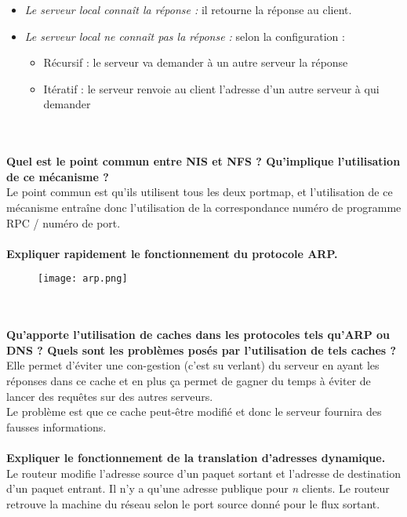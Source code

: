 \documentclass[journal, a4paper]{IEEEtran}
\begin{document}
\begin{itemize}
	\item \textit{Le serveur local connaît la réponse :} il retourne la réponse au client.
	\item \textit{Le serveur local ne connaît pas la réponse :} selon la configuration :
	\begin{itemize}
		\item Récursif : le serveur va demander à un autre serveur la réponse
		\item Itératif : le serveur renvoie au client l'adresse d'un autre serveur à qui demander
	\end{itemize}
\end{itemize}
~\\
~\\
\textbf{Quel est le point commun entre NIS et NFS ? Qu'implique l'utilisation de ce mécanisme ?}\\
Le point commun est qu'ils utilisent tous les deux portmap, et l'utilisation de ce mécanisme entraîne donc l'utilisation de la correspondance numéro de programme RPC / numéro de port.
~\\
~\\
\textbf{Expliquer rapidement le fonctionnement du protocole ARP.}\\
\begin{figure}[!hbt]
	\begin{center}
	\texttt{[image: arp.png]}
	\label{fig:arp}
	\end{center}
\end{figure}
~\\
~\\
\textbf{Qu'apporte l'utilisation de caches dans les protocoles tels qu'ARP ou DNS ? Quels sont les problèmes posés par l'utilisation de tels caches ?}\\
Elle permet d'éviter une con-gestion (c'est su verlant) du serveur en ayant les réponses dans ce cache et en plus ça permet de gagner du temps à éviter de lancer des requêtes sur des autres serveurs.\\
Le problème est que ce cache peut-être modifié et donc le serveur fournira des fausses informations.
~\\
~\\
\textbf{Expliquer le fonctionnement de la translation d'adresses dynamique.}\\
Le routeur modifie l'adresse source d'un paquet sortant et l'adresse de destination d'un paquet entrant. Il n'y a qu'une adresse publique pour \textit{n} clients. Le routeur retrouve la machine du réseau selon le port source donné pour le flux sortant.
\end{document}
